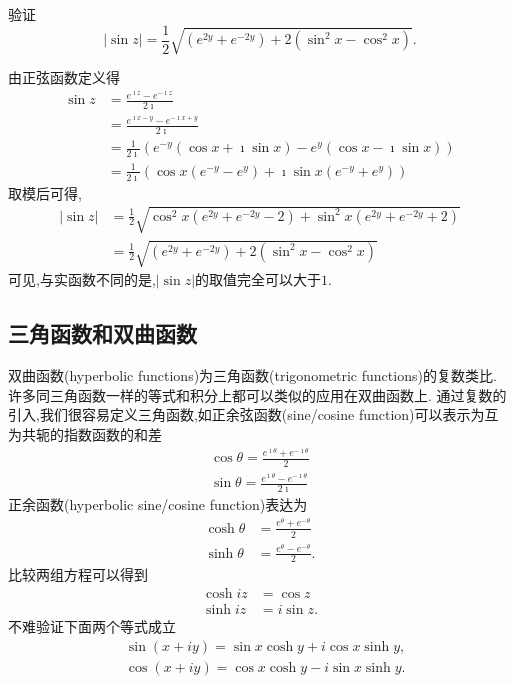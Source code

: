 \begin{example}
验证\[
    |\sin z|=\frac{1}{2} \sqrt{\left(e^{2 y}+e^{-2 y}\right)+2\left(\sin ^2 x-\cos ^2 x\right)} .
    \]
\end{example}
\begin{solution}
    由正弦函数定义得
    \begin{align*}
        \sin z &= \frac{e^{\imath z} - e^{-\imath z}}{2\imath} 
        \\ 
        & = \frac{e^{\imath x - y} - e^{-\imath x + y}}{2\imath}
        \\
        & = \frac{1}{2\imath}\left( e^{-y} (\cos x + \imath \sin x ) - e^{y} (\cos x - \imath \sin x ) \right) 
        \\
        & = \frac{1}{2\imath} \left( \cos x (e^{-y} - e^{y}) + \imath \sin x (e^{-y} + e^{y}) \right)
    \end{align*}
    取模后可得,
    \begin{align*}
        |\sin z | &= \frac{1}{2}\sqrt{ \cos^2x (e^{2y} + e^{-2y} -2) + \sin^2 x (e^{2y} + e^{-2y} +2) }
        \\
        &=\frac{1}{2}\sqrt{\left(e^{2 y}+e^{-2 y}\right)+2\left(\sin ^2 x-\cos ^2 x\right)}
    \end{align*}
    可见,与实函数不同的是,$|\sin z|$的取值完全可以大于$1$.
\end{solution}


\subsection{三角函数和双曲函数}
双曲函数(hyperbolic functions)为三角函数(trigonometric functions)的复数类比.
许多同三角函数一样的等式和积分上都可以类似的应用在双曲函数上.
通过复数的引入,我们很容易定义三角函数,如正余弦函数(sine/cosine function)可以表示为互为共轭的指数函数的和差
\begin{align}
    \cos \theta = \frac{e^{\imath \theta} + e^{ -\imath \theta} }{2}
    \\
    \sin \theta = \frac{e^{\imath \theta} - e^{ -\imath \theta} }{2\imath}
\end{align}
正余函数(hyperbolic sine/cosine function)表达为
\begin{align}
    \cosh \theta &= \frac{e^{\theta} + e^{ - \theta} }{2}
    \\
    \sinh \theta &= \frac{e^{\theta} - e^{ - \theta} }{2} .
\end{align}
比较两组方程可以得到
\begin{align}
    \cosh iz &= \cos z
    \\
    \sinh iz &= i \sin z.
\end{align}
不难验证下面两个等式成立
\begin{equation}
    \begin{aligned}
    & \sin (x+i y)=\sin x \cosh y+i \cos x \sinh y, \\
    & \cos (x+i y)=\cos x \cosh y-i \sin x \sinh y.
    \end{aligned}
\end{equation}

